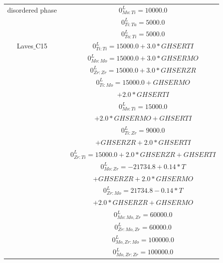 \begin{longtable}[H]{ c c c }
  disordered phase & \cite{Ansara1998} & $0^\textit{L}_{Mo:Ti} = 10000.0$\\
                              & \cite{Ansara1998} & $0^\textit{L}_{Ti:Ta} = 5000.0$\\
                              & \cite{Ansara1998} & $0^\textit{L}_{Ta:Ti} = 5000.0$\\
       Laves$\_$C15 & \cite{Kar2008} & $0^\textit{L}_{Ti:Ti} = 15000.0+3.0*GHSERTI$\\
                               & \cite{Perez2003} & $0^\textit{L}_{Mo:Mo} = 15000.0+3.0*GHSERMO$\\
                               & \cite{Perez2003}  & $0^\textit{L}_{Zr:Zr} = 15000.0+3.0*GHSERZR$\\
                               & \cite{Kar2008} & $0^\textit{L}_{Ti:Mo} = 15000.0+GHSERMO$\\
                               &                        & $+2.0*GHSERTI$\\
                               & \cite{Kar2008} & $0^\textit{L}_{Mo:Ti} = 15000.0$\\
                               &                        & $+2.0*GHSERMO+GHSERTI$\\
                               & \cite{Kar2008} & $0^\textit{L}_{Ti:Zr} = 9000.0$\\
                               &                        & $+GHSERZR+2.0*GHSERTI$\\
                               & \cite{Kar2008} & $0^\textit{L}_{Zr:Ti} = 15000.0+2.0*GHSERZR+GHSERTI$\\
                               & \cite{Perez2003}  & $0^\textit{L}_{Mo:Zr} = -21734.8+0.14*T$\\
                               &                             & $+GHSERZR+2.0*GHSERMO$\\
                               & \cite{Perez2003}  & $0^\textit{L}_{Zr:Mo} = 21734.8-0.14*T$\\
                               &                             & $+2.0*GHSERZR+GHSERMO$\\
                               & \cite{Perez2003} & $0^\textit{L}_{Mo:Mo,Zr} = 60000.0$\\
                               & \cite{Perez2003} & $0^\textit{L}_{Zr:Mo,Zr} = 60000.0$\\
                               & \cite{Perez2003}  & $0^\textit{L}_{Mo,Zr:Mo} = 100000.0$\\
                               & \cite{Perez2003}  & $0^\textit{L}_{Mo,Zr:Zr} = 100000.0$\\

\end{longtable}
